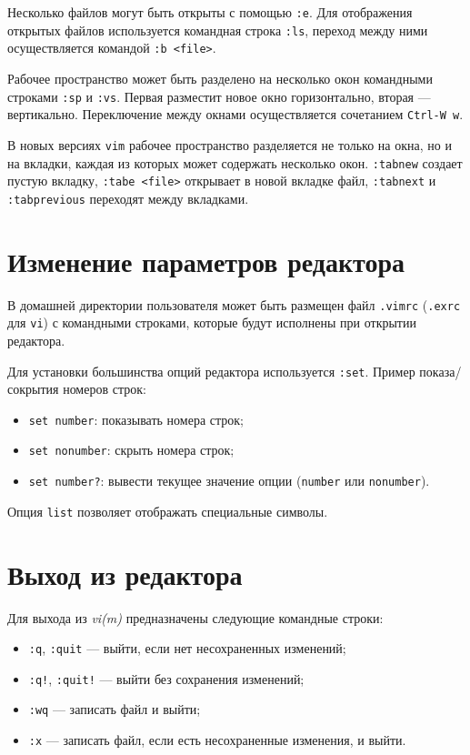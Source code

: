 \documentclass[listings]{labreport}
\begin{document}
Несколько файлов могут быть открыты с помощью \texttt{:e}. Для отображения открытых файлов используется
командная строка \texttt{:ls}, переход между ними осуществляется командой \texttt{:b <file>}.

Рабочее пространство может быть разделено на несколько окон командными строками \texttt{:sp} и \texttt{:vs}.
Первая разместит новое окно горизонтально, вторая — вертикально. Переключение между окнами осуществляется
сочетанием \texttt{Ctrl-W w}.

В новых версиях \texttt{vim} рабочее пространство разделяется не только на окна, но и на вкладки,
каждая из которых может содержать несколько окон. \texttt{:tabnew} создает пустую вкладку,
\texttt{:tabe <file>} открывает в новой вкладке файл, \texttt{:tabnext} и \texttt{:tabprevious}
переходят между вкладками.

\section*{Изменение параметров редактора}

В домашней директории пользователя может быть размещен файл \texttt{.vimrc} (\texttt{.exrc} для \texttt{vi})
с командными строками, которые будут исполнены при открытии редактора.

Для установки большинства опций редактора используется \texttt{:set}. Пример показа/сокрытия номеров строк:
\begin{itemize}
\item \texttt{set number}: показывать номера строк;
\item \texttt{set nonumber}: скрыть номера строк;
\item \texttt{set number?}: вывести текущее значение опции (\texttt{number} или \texttt{nonumber}).
\end{itemize}

Опция \texttt{list} позволяет отображать специальные символы.

\section*{Выход из редактора}

Для выхода из \textit{vi(m)} предназначены следующие командные строки:

\begin{itemize}
\item \texttt{:q}, \texttt{:quit} — выйти, если нет несохраненных изменений;
\item \texttt{:q!}, \texttt{:quit!} — выйти без сохранения изменений;
\item \texttt{:wq} — записать файл и выйти;
\item \texttt{:x} — записать файл, если есть несохраненные изменения, и выйти.
\end{itemize}
\end{document}
